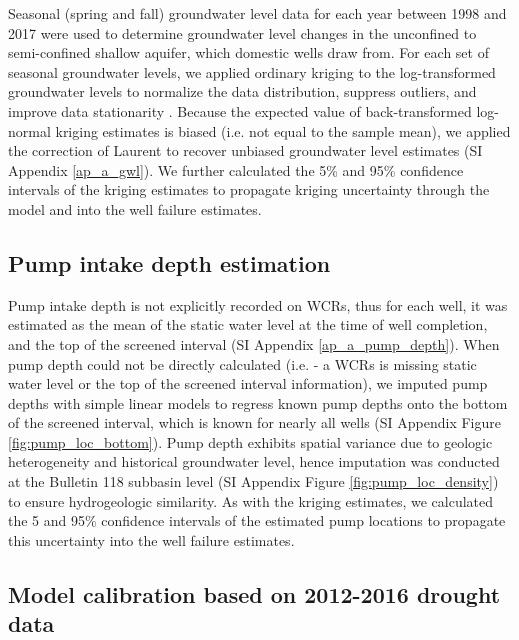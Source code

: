 Seasonal (spring and fall) groundwater level data for each year between 1998 and 2017 \citep{gwl} were used to determine groundwater level changes in the unconfined to semi-confined shallow aquifer, which domestic wells draw from. For each set of seasonal groundwater levels, we applied ordinary kriging to the log-transformed groundwater levels to normalize the data distribution, suppress outliers, and improve data stationarity \citep{DeutschC.V.andJournel1992, Varouchakis2012}. Because the expected value of back-transformed log-normal kriging estimates is biased (i.e. not equal to the sample mean), we applied the correction of Laurent \citep{Laurent1963, JournelA.G.Huijbregts1978} to recover unbiased groundwater level estimates (SI Appendix \ref{ap_a_gwl}). We further calculated the 5\% and 95\% confidence intervals of the kriging estimates to propagate kriging uncertainty through the model and into the well failure estimates.   


\subsection{Pump intake depth estimation}

Pump intake depth is not explicitly recorded on WCRs, thus for each well, it was estimated as the mean of the static water level at the time of well completion, and the top of the screened interval (SI Appendix \ref{ap_a_pump_depth}). When pump depth could not be directly calculated (i.e. - a WCRs is missing static water level or the top of the screened interval information), we imputed pump depths with simple linear models to regress known pump depths onto the bottom of the screened interval, which is known for nearly all wells (SI Appendix Figure \ref{fig:pump_loc_bottom}). Pump depth exhibits spatial variance due to geologic heterogeneity and historical groundwater level, hence imputation was conducted at the Bulletin 118 subbasin level (SI Appendix Figure \ref{fig:pump_loc_density}) to ensure hydrogeologic similarity. As with the kriging estimates, we calculated the 5 and 95\% confidence intervals of the estimated pump locations to propagate this uncertainty into the well failure estimates.    

\subsection{Model calibration based on 2012-2016 drought data}

